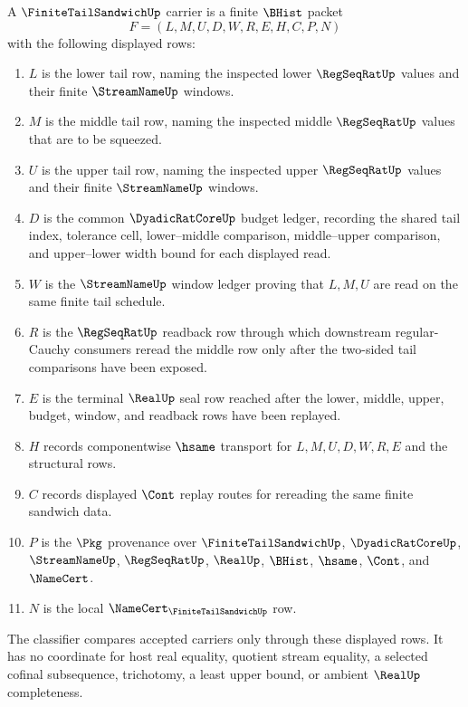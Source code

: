 \begin{definition}
\label{def:finite-tail-sandwich-carrier}
A $\FiniteTailSandwichUp$ carrier is a finite $\BHist$ packet
$$
F=(L,M,U,D,W,R,E,H,C,P,N)
$$
with the following displayed rows:
\begin{enumerate}
\item $L$ is the lower tail row, naming the inspected lower $\RegSeqRatUp$ values and their finite $\StreamNameUp$ windows.
\item $M$ is the middle tail row, naming the inspected middle $\RegSeqRatUp$ values that are to be squeezed.
\item $U$ is the upper tail row, naming the inspected upper $\RegSeqRatUp$ values and their finite $\StreamNameUp$ windows.
\item $D$ is the common $\DyadicRatCoreUp$ budget ledger, recording the shared tail index, tolerance cell, lower--middle comparison, middle--upper comparison, and upper--lower width bound for each displayed read.
\item $W$ is the $\StreamNameUp$ window ledger proving that $L,M,U$ are read on the same finite tail schedule.
\item $R$ is the $\RegSeqRatUp$ readback row through which downstream regular-Cauchy consumers reread the middle row only after the two-sided tail comparisons have been exposed.
\item $E$ is the terminal $\RealUp$ seal row reached after the lower, middle, upper, budget, window, and readback rows have been replayed.
\item $H$ records componentwise $\hsame$ transport for $L,M,U,D,W,R,E$ and the structural rows.
\item $C$ records displayed $\Cont$ replay routes for rereading the same finite sandwich data.
\item $P$ is the $\Pkg$ provenance over $\FiniteTailSandwichUp$, $\DyadicRatCoreUp$, $\StreamNameUp$, $\RegSeqRatUp$, $\RealUp$, $\BHist$, $\hsame$, $\Cont$, and $\NameCert$.
\item $N$ is the local $\NameCert_{\FiniteTailSandwichUp}$ row.
\end{enumerate}
The classifier compares accepted carriers only through these displayed rows. It has no coordinate for host real equality, quotient stream equality, a selected cofinal subsequence, trichotomy, a least upper bound, or ambient $\RealUp$ completeness.
\end{definition}

